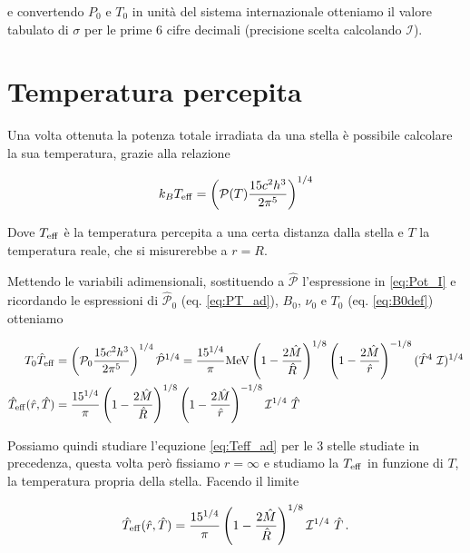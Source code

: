 \documentclass[a4paper, titlepage]{article}
\begin{document}
e convertendo $P_0$ e $T_0$ in unità del sistema internazionale otteniamo il
valore tabulato di $\sigma$ per le prime 6 cifre decimali (precisione scelta
calcolando $\mathcal I$).


\newpage


\section{Temperatura percepita}
\label{sec:temp_perc}

Una volta ottenuta la potenza totale irradiata da una stella è possibile
calcolare la sua temperatura, grazie alla relazione

\begin{equation}
    k_B T_{\rm eff} = \left( \mathcal P (T) \frac{15 c^2 h^3}{2 \pi^5} \right)^{1/4}
    \label{eq:Teff}
\end{equation}

Dove $T_{\rm eff}$ è la temperatura percepita a una certa distanza dalla stella e
$T$ la temperatura reale, che si misurerebbe a $r = R$.

Mettendo le variabili adimensionali, sostituendo a $\mathcal{\hat P}$
l'espressione in \ref{eq:Pot_I} e ricordando le espressioni di
$\mathcal{\hat P}_0$ (eq. \ref{eq:PT_ad}), $B_0$, $\nu_0$ e $T_0$ (eq.
\ref{eq:B0def}) otteniamo

\begin{align}
    T_0 \hat T_{\rm eff}
    &= \left( \mathcal P_0 \frac{15 c^2 h^3}{2 \pi^5} \right)^{1/4}
    \mathcal{\hat P}^{1/4}
    = \frac{15^{1/4}}{\pi} \unit{\mega\electronvolt}
    \left(1 - \frac{2 \hat M}{\hat R}\right)^{1/8}
    \left(1 - \frac{2 \hat M}{\hat r}\right)^{-1/8}
    (\hat T^4 ~ \mathcal I)^{1/4} \\
    \hat T_{\rm eff}(\hat r, \hat T)
    &= \frac{15^{1/4}}{\pi} \left(1 - \frac{2 \hat M}{\hat R} \right)^{1/8}
    \left(1 - \frac{2 \hat M}{\hat r}\right)^{-1/8} \mathcal I^{1/4} ~ \hat T \\
    \label{eq:Teff_ad}
\end{align}

Possiamo quindi studiare l'equzione \ref{eq:Teff_ad} per le 3 stelle studiate in
precedenza, questa volta però fissiamo $r = \infty$ e studiamo la $T_{\rm eff}$
in funzione di $T$, la temperatura propria della stella.
Facendo il limite

\begin{equation}
    \hat T_{\rm eff}(\hat r, \hat T) = \frac{15^{1/4}}{\pi}
    \left(1 - \frac{2 \hat M}{\hat R} \right)^{1/8} \mathcal I^{1/4} ~ \hat T \, .
    \label{eq:Teff_inf}
\end{equation}
\end{document}
